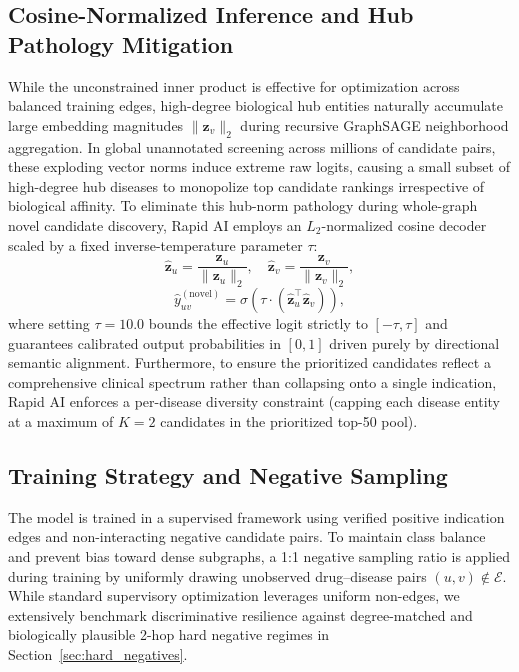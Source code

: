 \documentclass[preprint,12pt]{elsarticle}
\begin{document}
\subsection{Cosine-Normalized Inference and Hub Pathology Mitigation}
While the unconstrained inner product is effective for optimization across balanced training edges, high-degree biological hub entities naturally accumulate large embedding magnitudes $\|\mathbf{z}_v\|_2$ during recursive GraphSAGE neighborhood aggregation. In global unannotated screening across millions of candidate pairs, these exploding vector norms induce extreme raw logits, causing a small subset of high-degree hub diseases to monopolize top candidate rankings irrespective of biological affinity. To eliminate this hub-norm pathology during whole-graph novel candidate discovery, Rapid AI employs an $L_2$-normalized cosine decoder scaled by a fixed inverse-temperature parameter $\tau$:
\begin{equation}
    \hat{\mathbf{z}}_u = \frac{\mathbf{z}_u}{\|\mathbf{z}_u\|_2}, \quad \hat{\mathbf{z}}_v = \frac{\mathbf{z}_v}{\|\mathbf{z}_v\|_2},
\end{equation}
\begin{equation}
    \hat{y}_{uv}^{(\mathrm{novel})} = \sigma \left( \tau \cdot \left( \hat{\mathbf{z}}_u^\top \hat{\mathbf{z}}_v \right) \right),
\end{equation}
where setting $\tau = 10.0$ bounds the effective logit strictly to $[-\tau, \tau]$ and guarantees calibrated output probabilities in $[0, 1]$ driven purely by directional semantic alignment. Furthermore, to ensure the prioritized candidates reflect a comprehensive clinical spectrum rather than collapsing onto a single indication, Rapid AI enforces a per-disease diversity constraint (capping each disease entity at a maximum of $K = 2$ candidates in the prioritized top-50 pool).

\subsection{Training Strategy and Negative Sampling}
The model is trained in a supervised framework using verified positive indication edges and non-interacting negative candidate pairs. To maintain class balance and prevent bias toward dense subgraphs, a 1:1 negative sampling ratio is applied during training by uniformly drawing unobserved drug--disease pairs $(u, v) \notin \mathcal{E}$. While standard supervisory optimization leverages uniform non-edges, we extensively benchmark discriminative resilience against degree-matched and biologically plausible 2-hop hard negative regimes in Section~\ref{sec:hard_negatives}.
\end{document}
